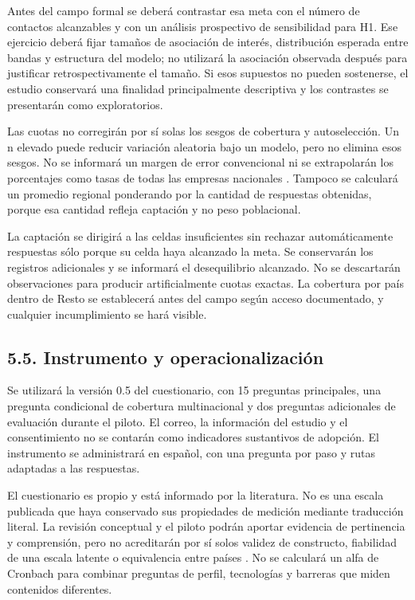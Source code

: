 \documentclass[12pt,letterpaper]{article}
\begin{document}
Antes del campo formal se deberá contrastar esa meta con el número de contactos alcanzables y con un análisis prospectivo de sensibilidad para H1. Ese ejercicio deberá fijar tamaños de asociación de interés, distribución esperada entre bandas y estructura del modelo; no utilizará la asociación observada después para justificar retrospectivamente el tamaño. Si esos supuestos no pueden sostenerse, el estudio conservará una finalidad principalmente descriptiva y los contrastes se presentarán como exploratorios.

Las cuotas no corregirán por sí solas los sesgos de cobertura y autoselección. Un n elevado puede reducir variación aleatoria bajo un modelo, pero no elimina esos sesgos. No se informará un margen de error convencional ni se extrapolarán los porcentajes como tasas de todas las empresas nacionales \citep{baker}. Tampoco se calculará un promedio regional ponderando por la cantidad de respuestas obtenidas, porque esa cantidad refleja captación y no peso poblacional.

La captación se dirigirá a las celdas insuficientes sin rechazar automáticamente respuestas sólo porque su celda haya alcanzado la meta. Se conservarán los registros adicionales y se informará el desequilibrio alcanzado. No se descartarán observaciones para producir artificialmente cuotas exactas. La cobertura por país dentro de Resto se establecerá antes del campo según acceso documentado, y cualquier incumplimiento se hará visible.

\subsection*{5.5. Instrumento y operacionalización}
Se utilizará la versión 0.5 del cuestionario, con 15 preguntas principales, una pregunta condicional de cobertura multinacional y dos preguntas adicionales de evaluación durante el piloto. El correo, la información del estudio y el consentimiento no se contarán como indicadores sustantivos de adopción. El instrumento se administrará en español, con una pregunta por paso y rutas adaptadas a las respuestas.

El cuestionario es propio y está informado por la literatura. No es una escala publicada que haya conservado sus propiedades de medición mediante traducción literal. La revisión conceptual y el piloto podrán aportar evidencia de pertinencia y comprensión, pero no acreditarán por sí solos validez de constructo, fiabilidad de una escala latente o equivalencia entre países \citep{boateng}. No se calculará un alfa de Cronbach para combinar preguntas de perfil, tecnologías y barreras que miden contenidos diferentes.
\end{document}

